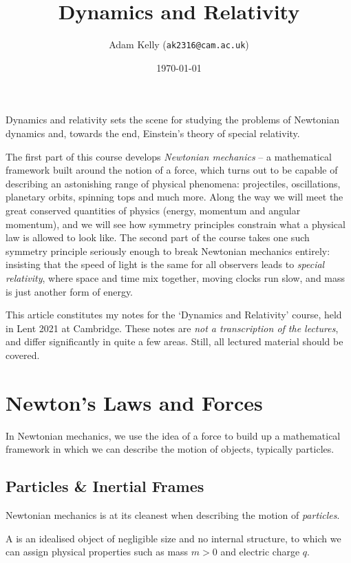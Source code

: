 \documentclass[a4paper]{scrartcl}
\title{Dynamics and Relativity}
\author{Adam Kelly (\texttt{ak2316@cam.ac.uk})}
\date{\today}
\begin{document}
\maketitle  

Dynamics and relativity sets the scene for studying the problems of Newtonian dynamics and, towards the end, Einstein's theory of special relativity.

The first part of this course develops \emph{Newtonian mechanics} -- a mathematical framework built around the notion of a force, which turns out to be capable of describing an astonishing range of physical phenomena: projectiles, oscillations, planetary orbits, spinning tops and much more. Along the way we will meet the great conserved quantities of physics (energy, momentum and angular momentum), and we will see how symmetry principles constrain what a physical law is allowed to look like. The second part of the course takes one such symmetry principle seriously enough to break Newtonian mechanics entirely: insisting that the speed of light is the same for all observers leads to \emph{special relativity}, where space and time mix together, moving clocks run slow, and mass is just another form of energy.

This article constitutes my notes for the `Dynamics and Relativity' course, held in Lent 2021 at Cambridge. These notes are \emph{not a transcription of the lectures}, and differ significantly in quite a few areas. Still, all lectured material should be covered.

\tableofcontents

\section{Newton's Laws and Forces}


In Newtonian mechanics, we use the idea of a force to build up a mathematical framework in which we can describe the motion of objects, typically particles.

\subsection{Particles \& Inertial Frames}

Newtonian mechanics is at its cleanest when describing the motion of \emph{particles}.

\begin{definition}[Particle]
	A  is an idealised object of negligible size and no internal structure, to which we can assign physical properties such as mass $m > 0$ and electric charge $q$.
\end{definition}
\end{document}
